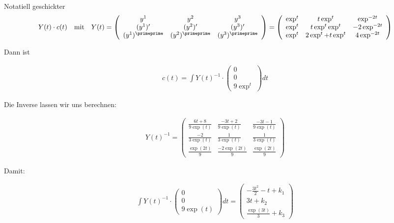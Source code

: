 \begin{solution}
Notatiell geschickter
\begin{align*}
  Y(t) \cdot c(t) \quad \text{mit} \quad
  Y(t) = \left(
  \begin{array}{ccc}
    y^1 & y^2 & y^3 \\
    (y^1)^\prime & (y^2)^\prime & (y^3)^\prime \\
    (y^1)^\primeprime & (y^2)^\primeprime & (y^3)^\primeprime
  \end{array}
  \right)  =
  \left(
  \begin{array}{ccc}
    \exp^t & t\exp^t & \exp^{-2t} \\
    \exp^t & t\exp^t \exp^t & -2\exp^{-2t} \\
    \exp^t & 2\exp^t + t\exp^t & 4\exp^{-2t}
  \end{array}
  \right)
\end{align*}

Dann ist

\begin{align*}
  c(t) = \int Y(t)^{-1} \cdot
  \left(
  \begin{array}{c}
    0 \\
    0 \\
    9\exp^t
  \end{array}
  \right) dt
\end{align*}

Die Inverse lassen wir uns berechnen:

\begin{align*}
  Y(t)^{-1} = \left(
  \begin{array}{ccc}
    \frac{6t+8}{9\exp(t)} & \frac{-3t+2}{9\exp(t)} & \frac{-3t-1}{9\exp(t)} \\
    \frac{-2}{3\exp(t)} & \frac{1}{3\exp(t)} & \frac{1}{3\exp(t)} \\
    \frac{\exp(2t)}{9} & \frac{-2\exp(2t)}{9} & \frac{\exp(2t)}{9}
  \end{array}
  \right)
\end{align*}

Damit:

\begin{align*}
  \int Y(t)^{-1} \cdot
  \left(
  \begin{array}{c}
    0 \\
    0 \\
    9\exp(t)
  \end{array}
  \right)dt = \left(
  \begin{array}{c}
    -\frac{3t^2}{2} - t + k_1 \\
    3t + k_2 \\
    \frac{\exp(3t)}{3} + k_3
  \end{array}
  \right)
\end{align*}


\end{solution}

